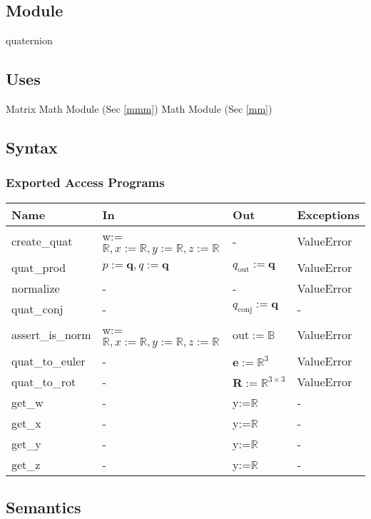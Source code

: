 \documentclass[12pt, titlepage]{article}
\begin{document}
\subsection{Module}
quaternion

\subsection{Uses}
Matrix Math Module (Sec \ref{mmm}) \newline
Math Module (Sec \ref{mm})

\subsection{Syntax}

\subsubsection{Exported Access Programs}

\begin{center}
\begin{tabular}{p{2.5cm} p{5.5cm} p{2cm} p{2cm}}
\hline
\textbf{Name} & \textbf{In} & \textbf{Out} & \textbf{Exceptions} \\
\hline
create\_quat & w:=$\mathbb{R}, x:=\mathbb{R}, y:=\mathbb{R}, z:=\mathbb{R}$ & - & ValueError \\
quat\_prod & $p:=\mathbf{q},  q:=\mathbf{q}$ & $q_\text{out}:=\mathbf{q}$ & ValueError \\
normalize & - & - & ValueError \\
quat\_conj & - & $q_\text{conj}:= \mathbf{q}$ & - \\
assert\_is\_norm & w:=$\mathbb{R}, x:=\mathbb{R}, y:=\mathbb{R}, z:=\mathbb{R}$ & out$:=\mathbb{B}$
& ValueError \\
quat\_to\_euler & - & $\mathbf{e}:=\mathbb{R}^3$ & ValueError \\
quat\_to\_rot & - & $\mathbf{R} := \mathbb{R}^{3 \times 3}$ & ValueError \\
get\_w & - & y:=$\mathbb{R}$ & - \\
get\_x & - & y:=$\mathbb{R}$ & - \\
get\_y & - & y:=$\mathbb{R}$ & - \\
get\_z & - & y:=$\mathbb{R}$ & - \\
\hline
\end{tabular}
\end{center}

\subsection{Semantics}
\end{document}

